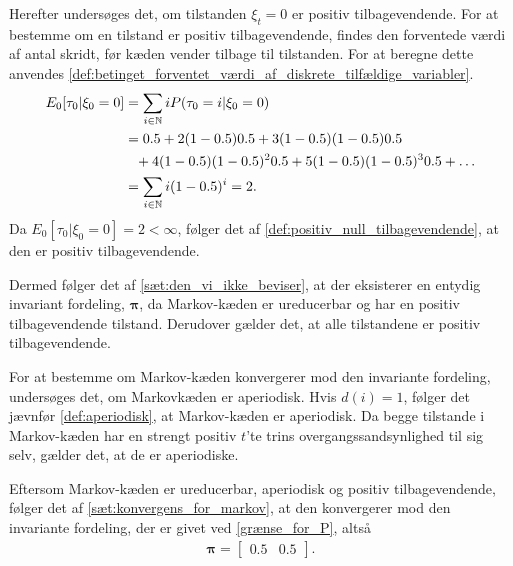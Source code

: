 Herefter undersøges det, om tilstanden $\xi_t = 0$ er positiv tilbagevendende. For at bestemme om en tilstand er positiv tilbagevendende, findes den forventede værdi af antal skridt, før kæden vender tilbage til tilstanden. For at beregne dette anvendes \autoref{def:betinget_forventet_værdi_af_diskrete_tilfældige_variabler}.
 \begin{align*}
     E_0[\tau_{0}|\xi_0=0]&=\sum_{i\in \mathbb{N}} iP(\tau_{0}=i|\xi_0=0)\\
     &=0.5+2(1-0.5)0.5+3(1-0.5)(1-0.5)0.5\\
     &\phantom{=} +4(1-0.5)(1-0.5)^20.5+5(1-0.5)(1-0.5)^30.5+\ldots\\
     &= \sum_{i \in \mathbb{N} } i(1-0.5)^{i} = 2.
 \end{align*}
Da $E_0[\tau_{0}|\xi_0=0]=2<\infty$, følger det af \autoref{def:positiv_null_tilbagevendende}, at den er positiv tilbagevendende.

Dermed følger det af \autoref{sæt:den_vi_ikke_beviser}, at der eksisterer en entydig invariant fordeling, $\bm \pi$, da Markov-kæden er ureducerbar og har en positiv tilbagevendende tilstand. Derudover gælder det, at alle tilstandene er positiv tilbagevendende.


For at bestemme om Markov-kæden konvergerer mod den invariante fordeling, undersøges det, om Markovkæden er aperiodisk. Hvis $d(i)=1$, følger det jævnfør \autoref{def:aperiodisk}, at Markov-kæden er aperiodisk. Da begge tilstande i Markov-kæden har en strengt positiv $t$'te trins overgangssandsynlighed til sig selv, gælder det, at de er aperiodiske. 

Eftersom Markov-kæden er ureducerbar, aperiodisk og positiv tilbagevendende, følger det af \autoref{sæt:konvergens_for_markov}, at den konvergerer mod den invariante fordeling, der er givet ved \eqref{grænse_for_P}, altså
\begin{align}
    \bm \pi = \begin{bmatrix} 0.5 & 0.5\end{bmatrix}.
\end{align}


